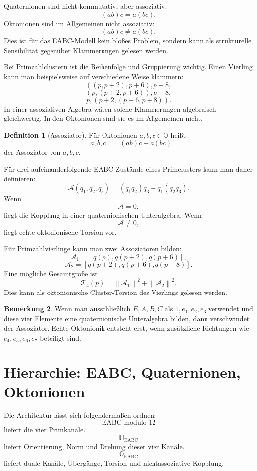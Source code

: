 \documentclass[11pt,a4paper]{article}
\theoremstyle{definition}
\newtheorem{definition}{Definition}[section]
\newtheorem{bemerkung}[definition]{Bemerkung}
\theoremstyle{plain}
\newcommand{\HH}{\mathbb{H}}
\newcommand{\OO}{\mathbb{O}}
\newcommand{\EABC}{\mathrm{EABC}}
\newcommand{\norm}[1]{\left\lVert #1 \right\rVert}
\begin{document}
	Quaternionen sind nicht kommutativ, aber assoziativ:
	\[
	(ab)c=a(bc).
	\]
	Oktonionen sind im Allgemeinen nicht assoziativ:
	\[
	(ab)c\neq a(bc).
	\]
	Dies ist für das EABC-Modell kein bloßes Problem, sondern kann als strukturelle Sensibilität gegenüber Klammerungen gelesen werden.
	
	Bei Primzahlclustern ist die Reihenfolge und Gruppierung wichtig. Einen Vierling kann man beispielsweise auf verschiedene Weise klammern:
	\[
	((p,p+2),p+6),p+8,
	\]
	\[
	(p,(p+2,p+6)),p+8,
	\]
	\[
	p,(p+2,(p+6,p+8)).
	\]
	In einer assoziativen Algebra wären solche Klammerungen algebraisch gleichwertig. In den Oktonionen sind sie es im Allgemeinen nicht.
	
	\begin{definition}[Assoziator]
		Für Oktonionen $a,b,c\in\OO$ heißt
		\[
		[a,b,c]=(ab)c-a(bc)
		\]
		der Assoziator von $a,b,c$.
	\end{definition}
	
	Für drei aufeinanderfolgende EABC-Zustände eines Primclusters kann man daher definieren:
	\[
	\mathcal A(q_1,q_2,q_3)
	=
	(q_1q_2)q_3-q_1(q_2q_3).
	\]
	Wenn
	\[
	\mathcal A=0,
	\]
	liegt die Kopplung in einer quaternionischen Unteralgebra. Wenn
	\[
	\mathcal A\neq 0,
	\]
	liegt echte oktonionische Torsion vor.
	
	Für Primzahlvierlinge kann man zwei Assoziatoren bilden:
	\[
	\mathcal A_1=[q(p),q(p+2),q(p+6)],
	\]
	\[
	\mathcal A_2=[q(p+2),q(p+6),q(p+8)].
	\]
	Eine mögliche Gesamtgröße ist
	\[
	\mathcal T_4(p)
	=
	\norm{\mathcal A_1}^2+
	\norm{\mathcal A_2}^2.
	\]
	Dies kann als oktonionische Cluster-Torsion des Vierlings gelesen werden.
	
	\begin{bemerkung}
		Wenn man ausschließlich $E,A,B,C$ als $1,e_1,e_2,e_3$ verwendet und diese vier Elemente eine quaternionische Unteralgebra bilden, dann verschwindet der Assoziator. Echte Oktonionik entsteht erst, wenn zusätzliche Richtungen wie $e_4,e_5,e_6,e_7$ beteiligt sind.
	\end{bemerkung}
	
	\section{Hierarchie: EABC, Quaternionen, Oktonionen}
	
	Die Architektur lässt sich folgendermaßen ordnen:
	\[
	\boxed{\text{EABC modulo }12}
	\]
	liefert die vier Primkanäle.
	\[
	\boxed{\HH_{\EABC}}
	\]
	liefert Orientierung, Norm und Drehung dieser vier Kanäle.
	\[
	\boxed{\OO_{\EABC}}
	\]
	liefert duale Kanäle, Übergänge, Torsion und nichtassoziative Kopplung.
	
\end{document}
